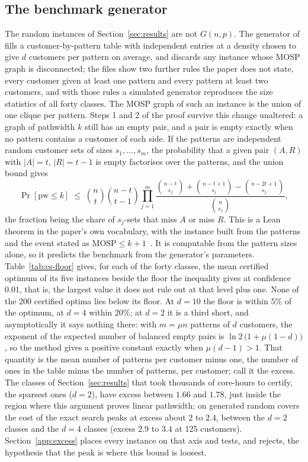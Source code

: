 \subsection{The benchmark generator}
\label{app:random-cs}

The random instances of Section~\ref{sec:results} are not $G(n,p)$. The
generator of \citet{ChuStuckey2009} fills a customer-by-pattern table with
independent entries at a density chosen to give $d$ customers per pattern on
average, and discards any instance whose MOSP graph is disconnected; the
files show two further rules the paper does not state, every customer given
at least one pattern and every pattern at least two customers, and with those
rules a simulated generator reproduces the size statistics of all forty
classes. The MOSP graph of such an instance is the union of one clique per
pattern. Steps 1 and 2 of the proof survive this change unaltered: a graph of
pathwidth $k$ still has an empty pair, and a pair is empty exactly when no
pattern contains a customer of each side. If the patterns are independent
random customer sets of sizes $s_1,\dots,s_m$, the probability that a given
pair $(A,R)$ with $|A|=t$, $|R|=t-1$ is empty factorises over the patterns,
and the union bound gives
\[
  \Pr[\mathrm{pw}\le k]\;\le\;\binom nt\binom{n-t}{t-1}\prod_{j=1}^{m}
  \frac{\binom{n-t}{s_j}+\binom{n-t+1}{s_j}-\binom{n-2t+1}{s_j}}{\binom{n}{s_j}},
\]
the fraction being the share of $s_j$-sets that miss $A$ or miss $R$. This is
a Lean theorem in the paper's own vocabulary, with the instance built from the
patterns and the event stated as $\mathrm{MOSP}\le k+1$~.
It is computable from the pattern sizes alone, so it predicts the benchmark
from the generator's parameters. Table~\ref{tab:cs-floor} gives, for each of
the forty classes, the mean certified optimum of its five instances beside
the floor the inequality gives at confidence $0.01$, that is, the largest
value it does not rule out at that level plus one. None of the 200 certified
optima lies below its floor. At $d=10$ the floor is within $5\%$ of the
optimum, at $d=4$ within $20\%$; at $d=2$ it is a third short, and
asymptotically it says nothing there: with $m=\mu n$ patterns of $d$
customers, the exponent of the expected number of balanced empty pairs is
$\ln2\,\bigl(1+\mu(1-d)\bigr)$, so the method gives a positive constant
exactly when $\mu(d-1)>1$. That quantity is the mean number of patterns per
customer minus one, the number of ones in the table minus the number of
patterns, per customer; call it the excess. The classes of
Section~\ref{sec:results} that took thousands of core-hours to certify, the
sparsest ones ($d=2$), have excess between $1.66$ and $1.78$, just inside the
region where this argument proves linear pathwidth; on generated random covers
the cost of the exact search peaks at excess about $2$ to $2.4$, between the
$d=2$ classes and the $d=4$ classes (excess $2.9$ to $3.4$ at 125 customers).
Section~\ref{app:excess} places every instance on that axis and tests, and
rejects, the hypothesis that the peak is where this bound is loosest.

